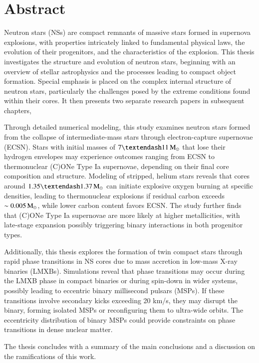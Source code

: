 \documentclass[main.tex]{subfiles}
\begin{document}
    \chapter*{Abstract}
    Neutron stars (NSs) are compact remnants of massive stars formed in supernova explosions, with properties intricately linked to fundamental physical laws, the evolution of their progenitors, and the characteristics of the explosion. This thesis investigates the structure and evolution of neutron stars, beginning with an overview of stellar astrophysics and the processes leading to compact object formation. Special emphasis is placed on the complex internal structure of neutron stars, particularly the challenges posed by the extreme conditions found within their cores. It then presents two separate research papers in subsequent chapters,

    Through detailed numerical modeling, this study examines neutron stars formed from the collapse of intermediate-mass stars through electron-capture supernovae (ECSN). Stars with initial masses of $7–11\msun$ that lose their hydrogen envelopes may experience outcomes ranging from ECSN to thermonuclear (C)ONe Type Ia supernovae, depending on their final core composition and structure. Modeling of stripped, helium stars reveals that cores around $1.35–1.37\msun$ can initiate explosive oxygen burning at specific densities, leading to thermonuclear explosions if residual carbon exceeds $\sim 0.005\mathrm{\,M_\odot}$, while lower carbon content favors ECSN. The study further finds that (C)ONe Type Ia supernovae are more likely at higher metallicities, with late-stage expansion possibly triggering binary interactions in both progenitor types.

    Additionally, this thesis explores the formation of twin compact stars through rapid phase transitions in NS cores due to mass accretion in low-mass X-ray binaries (LMXBs). Simulations reveal that phase transitions may occur during the LMXB phase in compact binaries or during spin-down in wider systems, possibly leading to eccentric binary millisecond pulsars (MSPs). If these transitions involve secondary kicks exceeding 20 km/s, they may disrupt the binary, forming isolated MSPs or reconfiguring them to ultra-wide orbits. The eccentricity distribution of binary MSPs could provide constraints on phase transitions in dense nuclear matter.

    The thesis concludes with a summary of the main conclusions and a discussion on the ramifications of this work.
\end{document}
